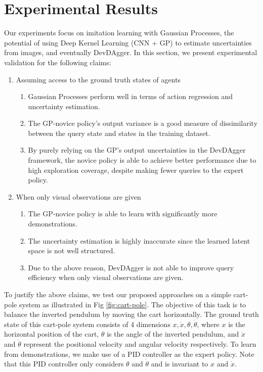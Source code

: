 \documentclass[11pt, reqno, letterpaper, twoside]{amsart}
\begin{document}
\section{Experimental Results}
Our experiments focus on imitation learning with Gaussian Processes, the
potential of using Deep Kernel Learning (CNN + GP) to estimate uncertainties
from images, and eventually DevDAgger. In this section, we present experimental
validation for the following claims:
\begin{enumerate}
	\item Assuming access to the ground truth states of agents
	      \begin{enumerate}
		      \item Gaussian Processes perform well in terms of action regression
		            and uncertainty estimation.
		      \item The GP-novice policy’s output variance is a good measure of
		            dissimilarity between the query state and states in the training
		            dataset.
		      \item By purely relying on the GP's output uncertainties in the
		            DevDAgger framework, the novice policy is able to achieve better
		            performance due to high exploration coverage, despite making
		            fewer queries to the expert policy.
	      \end{enumerate}

	\item When only visual observations are given
	      \begin{enumerate}
		      \item The GP-novice policy is able to learn with significantly more
		            demonstrations.
		      \item The uncertainty estimation is highly inaccurate since the
		            learned latent space is not well structured.
		      \item Due to the above reason, DevDAgger is not able to improve query
		            efficiency when only visual observations are given.
	      \end{enumerate}
\end{enumerate}

To justify the above claims, we test our proposed approaches on a simple
cart-pole system as illustrated in Fig \ref{fig:cart-pole}. The objective of
this task is to balance the inverted pendulum by moving the cart horizontally.
The ground truth state of this cart-pole system consists of 4 dimensions $x,
	\Dot{x}, \theta, \Dot{\theta}$, where $x$ is the horizontal position of the
cart, $\theta$ is the angle of the inverted pendulum, and $\Dot{x}$ and
$\Dot{\theta}$ represent the positional velocity and angular velocity
respectively. To learn from demonstrations, we make use of a PID controller as
the expert policy. Note that this PID controller only considers $\theta$ and
$\Dot{\theta}$ and is invariant to $x$ and $\Dot{x}$.
\end{document}
